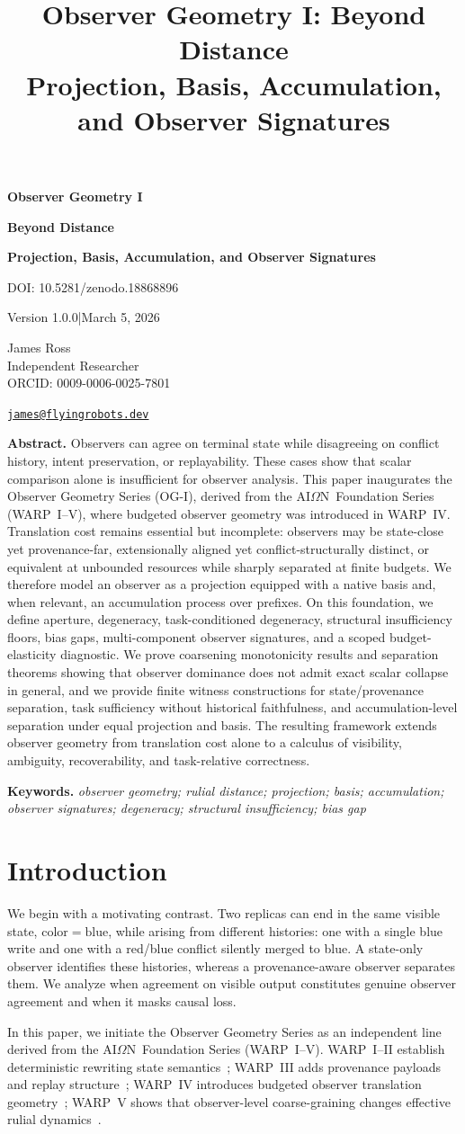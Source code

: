 \documentclass[11pt,twoside]{article}
\title{Observer Geometry I: Beyond Distance\\\large Projection, Basis, Accumulation, and Observer Signatures}
\author{}
\date{}
\newcommand{\paperdoi}{DOI: 10.5281/zenodo.18868896}
\newcommand{\paperversion}{Version 1.0.0}
\newcommand{\publicationdate}{March 5, 2026}
\theoremstyle{definition}
\newcommand{\blue}{\mathrm{blue}}
\newcommand{\AION}{AI\ensuremath{\Omega}N}
\newcommand{\paperkeywords}{observer geometry; rulial distance; projection; basis; accumulation; observer signatures; degeneracy; structural insufficiency; bias gap}
\newcommand{\paperabstract}{Observers can agree on terminal state while disagreeing on conflict history, intent preservation, or replayability. These cases show that scalar comparison alone is insufficient for observer analysis. This paper inaugurates the Observer Geometry Series (OG-I), derived from the \AION\ Foundation Series (WARP~I--V), where budgeted observer geometry was introduced in WARP~IV. Translation cost remains essential but incomplete: observers may be state-close yet provenance-far, extensionally aligned yet conflict-structurally distinct, or equivalent at unbounded resources while sharply separated at finite budgets. We therefore model an observer as a projection equipped with a native basis and, when relevant, an accumulation process over prefixes. On this foundation, we define aperture, degeneracy, task-conditioned degeneracy, structural insufficiency floors, bias gaps, multi-component observer signatures, and a scoped budget-elasticity diagnostic. We prove coarsening monotonicity results and separation theorems showing that observer dominance does not admit exact scalar collapse in general, and we provide finite witness constructions for state/provenance separation, task sufficiency without historical faithfulness, and accumulation-level separation under equal projection and basis. The resulting framework extends observer geometry from translation cost alone to a calculus of visibility, ambiguity, recoverability, and task-relative correctness.}
\begin{document}
\begingroup
\thispagestyle{ogtitle}
\begin{center}
\vspace*{-0.03\textheight}
{\fontsize{28}{32}\selectfont\bfseries{}\selectfont Observer Geometry I\par}
{\fontsize{24}{28}\selectfont\bfseries{} Beyond Distance\par}
\vspace{0.20em}
{\Large\bfseries Projection, Basis, Accumulation, and Observer Signatures\par}
\vspace{0.18em}
{\normalsize \paperdoi\\[-0.22em]}
{\normalsize \paperversion\enspace|\enspace\publicationdate\par}
\vspace{0.48em}
{\large James Ross\\[-0.14em]}
{\normalsize Independent Researcher\\[-0.14em]}
{\normalsize ORCID: 0009-0006-0025-7801\\[-0.14em]}
{\normalsize \href{mailto:james@flyingrobots.dev}{\texttt{james@flyingrobots.dev}}\par}
\vspace{0.85em}
\begin{minipage}{0.8\textwidth}
\small
\textbf{Abstract.} \paperabstract
\par
\vspace{1.25em}
\textbf{Keywords.} \textit{\paperkeywords}
\end{minipage}
\end{center}
\endgroup
\clearpage

\begingroup
{}
\setlength{\parskip}{0pt}
\tableofcontents
\endgroup

\section{Introduction}
\label{sec:intro}

We begin with a motivating contrast. Two replicas can end in the same visible state, \(\mathrm{color}=\blue\), while arising from different histories: one with a single blue write and one with a red/blue conflict silently merged to blue. A state-only observer identifies these histories, whereas a provenance-aware observer separates them. We analyze when agreement on visible output constitutes genuine observer agreement and when it masks causal loss.

In this paper, we initiate the Observer Geometry Series as an independent line derived from the \AION\ Foundation Series (WARP~I--V). WARP~I--II establish deterministic rewriting state semantics~\cite{ross_paper_i,ross_paper_ii}; WARP~III adds provenance payloads and replay structure~\cite{ross_paper_iii}; WARP~IV introduces budgeted observer translation geometry~\cite{ross_paper_iv}; WARP~V shows that observer-level coarse-graining changes effective rulial dynamics~\cite{ross_paper_v}.
\end{document}
